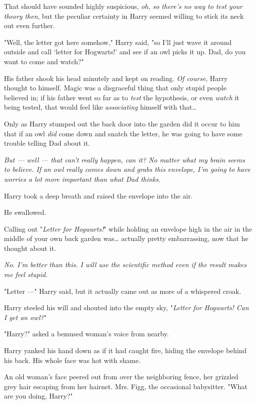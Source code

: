 That should have sounded highly suspicious, \emph{oh, so there's
no way to test your theory then}, but the peculiar
certainty in Harry seemed willing to stick its neck out even further.

"Well, the letter got here somehow," Harry said, "so I'll
just wave it around outside and call `letter for Hogwarts!'
and see if an owl picks it up. Dad, do you want to come and watch?"

His father shook his head minutely and kept on reading.
\emph{Of course}, Harry thought to himself. Magic was a
disgraceful thing that only stupid people believed in; if his
father went so far as to \emph{test} the hypothesis, or even
\emph{watch} it being tested, that would feel like \emph{associating}
himself with that{\ldots}

Only as Harry stumped out the back door into the garden
did it occur to him that if an owl \emph{did} come down and
snatch the letter, he was going to have some trouble
telling Dad about it.

\emph{But --- well --- that can't \emph{really} happen, can it? No matter
what my brain seems to believe. If an owl really comes
down and grabs this envelope, I'm going to have worries
a lot more important than what Dad thinks.}

Harry took a deep breath and raised the envelope into the air.

He swallowed.

Calling out "\emph{Letter for Hogwarts!}" while holding an envelope
high in the air in the middle of your own back garden
was{\ldots} actually pretty embarrassing, now that he thought
about it.

\emph{No. I'm better than this. I will use the scientific method
even if the result makes me feel stupid.}

"Letter ---" Harry said, but it actually came out as more of a
whispered croak.

Harry steeled his will and shouted into the empty sky,
"\emph{Letter for Hogwarts! Can I get an owl?}"

"Harry?" asked a bemused woman's voice from nearby.

Harry yanked his hand down as if it had caught fire,
hiding the envelope behind his back. His whole face was hot with shame.

An old woman's face peered out from over the
neighboring fence, her grizzled grey hair escaping from her
hairnet. Mrs. Figg, the occasional babysitter. "What are you
doing, Harry?"

